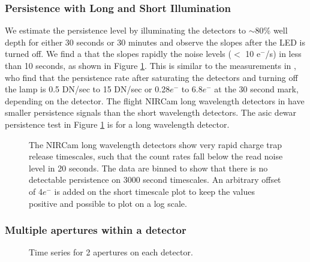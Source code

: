 \documentclass{aastex62}
\begin{document}
\subsubsection{Persistence with Long and Short Illumination}
We estimate the persistence level by illuminating the detectors to $\sim$80\% well depth for either 30 seconds or 30 minutes and observe the slopes after the LED is turned off.
We find a that the slopes rapidly the noise levels ($<$ 10 e$^-$/s) in less than 10 seconds, as shown in Figure \ref{fig:persistenceAZlab04}.
This is similar to the measurements in \citet{leisenring2016persistence}, who find that the persistence rate after saturating the detectors and turning off the lamp is 0.5 DN/sec to 15 DN/sec or 0.28$e^-$ to 6.8$e^-$ at the 30 second mark, depending on the detector.
The flight NIRCam long wavelength detectors in \citet{leisenring2016persistence} have smaller persistence signals than the short wavelength detectors.
The asic dewar persistence test in Figure \ref{fig:persistenceAZlab04} is for a long wavelength detector.

\begin{figure}
{}
\caption{The NIRCam long wavelength detectors show very rapid charge trap release timescales, such that the count rates fall below the read noise level in 20 seconds.
The data are binned to show that there is no detectable persistence on 3000 second timescales.
An arbitrary offset of 4$e^-$ is added on the short timescale plot to keep the values positive and possible to plot on a log scale.}\label{fig:persistenceAZlab04}
\end{figure}

\clearpage
\subsubsection{Multiple apertures within a detector}
\begin{figure}
{}
{}
{}
\caption{Time series for 2 apertures on each detector.}\label{fig:twoApPerDetector}
\end{figure}
\end{document}
